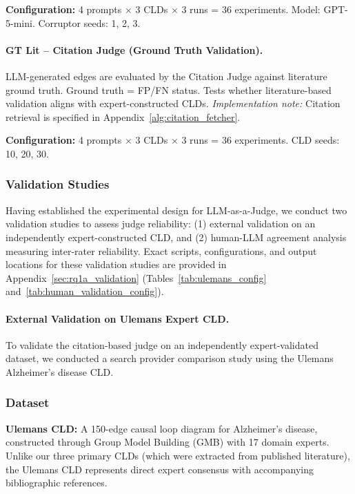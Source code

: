\textbf{Configuration:} 4 prompts $\times$ 3 CLDs $\times$ 3 runs = 36 experiments. Model: GPT-5-mini. Corruptor seeds: 1, 2, 3.

\paragraph{GT Lit -- Citation Judge (Ground Truth Validation).}
LLM-generated edges are evaluated by the Citation Judge against literature ground truth. Ground truth = FP/FN status. Tests whether literature-based validation aligns with expert-constructed CLDs.
\textit{Implementation note:} Citation retrieval is specified in Appendix~\ref{alg:citation_fetcher}.

\textbf{Configuration:} 4 prompts $\times$ 3 CLDs $\times$ 3 runs = 36 experiments. CLD seeds: 10, 20, 30.

\subsubsection{Validation Studies}

Having established the experimental design for LLM-as-a-Judge, we conduct two validation studies to assess judge reliability: (1) external validation on an independently expert-constructed CLD, and (2) human-LLM agreement analysis measuring inter-rater reliability.
Exact scripts, configurations, and output locations for these validation studies are provided in Appendix~\ref{sec:rq1a_validation} (Tables~\ref{tab:ulemans_config} and~\ref{tab:human_validation_config}).

\paragraph{External Validation on Ulemans Expert CLD.}

To validate the citation-based judge on an independently expert-validated dataset, we conducted a search provider comparison study using the Ulemans Alzheimer's disease CLD.

\subsubsection{Dataset}

\textbf{Ulemans CLD:} A 150-edge causal loop diagram for Alzheimer's disease, constructed through Group Model Building (GMB) with 17 domain experts. Unlike our three primary CLDs (which were extracted from published literature), the Ulemans CLD represents direct expert consensus with accompanying bibliographic references.

